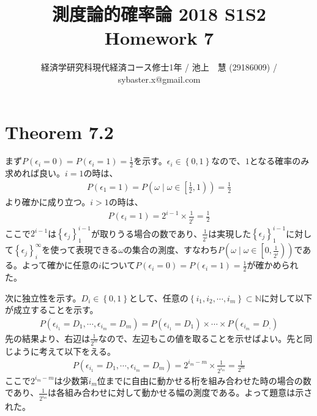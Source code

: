 \documentclass{article}
\begin{document}
\title{測度論的確率論 2018 S1S2 \\ 
Homework 7}
\author{経済学研究科現代経済コース修士1年 / 池上　慧 (29186009) / sybaster.x@gmail.com}
\maketitle

\section{Theorem 7.2}
まず$P(\epsilon_i = 0) = P(\epsilon_i = 1) = \frac{1}{2}$を示す。$\epsilon_i \in \left\{ 0,1\right\}$なので、$1$となる確率のみ求めれば良い。$i = 1$の時は、
\begin{align*}
	P(\epsilon_1 = 1) = P\left(\omega \mid \omega \in \left[\frac{1}{2}, 1\right)\right) = \frac{1}{2}
\end{align*}
より確かに成り立つ。$i > 1$の時は、
\begin{align*}
	P(\epsilon_i = 1) = 2^{i-1} \times \frac{1}{2^i} = \frac{1}{2}
\end{align*}
ここで$2^{i-1}$は$\left\{ \epsilon_j \right\}_1^{i-1}$が取りうる場合の数であり、$\frac{1}{2^i}$は実現した$\left\{ \epsilon_j \right\}_1^{i-1}$に対して$\left\{ \epsilon_j \right\}_i^{\infty}$を使って表現できる$\omega$の集合の測度、すなわち$P\left(\omega \mid \omega \in \left[0, \frac{1}{2^i}\right) \right)$である。よって確かに任意の$i$について$P(\epsilon_i = 0) = P(\epsilon_i = 1) = \frac{1}{2}$が確かめられた。

次に独立性を示す。$D_i \in \left\{ 0,1\right\}$として、任意の$\left\{ i_1, i_2, \cdots, i_m \right\} \subset \mathbb{N}$に対して以下が成立することを示す。
\begin{align*}
	P\left( \epsilon_{i_1} = D_1, \cdots, \epsilon_{i_m} = D_m \right) = P\left( \epsilon_{i_1} = D_1\right) \times \cdots \times P\left( \epsilon_{i_m} = D_,\right)
\end{align*}
先の結果より、右辺は$\frac{1}{2^m}$なので、左辺もこの値を取ることを示せばよい。先と同じように考えて以下をえる。
\begin{align*}
	P\left( \epsilon_{i_1} = D_1, \cdots, \epsilon_{i_m} = D_m \right) = 2^{i_m - m} \times \frac{1}{2^{i_m}} = \frac{1}{2^m}
\end{align*}
ここで$2^{i_m - m}$は少数第$i_m$位までに自由に動かせる桁を組み合わせた時の場合の数であり、$\frac{1}{2^{i_m}}$は各組み合わせに対して動かせる幅の測度である。よって題意は示された。
\end{document}
